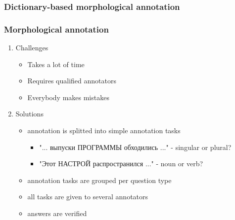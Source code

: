 \documentclass{beamer}
\begin{document}
\begin{frame}
\frametitle{Dictionary-based morphological annotation}
\begin{figure}
\end{figure}
\end{frame}


\begin{frame}
\frametitle{Morphological annotation}
\begin{enumerate}
\item{Challenges}
    \begin{itemize}
    \item{Takes a lot of time}
    \item{Requires qualified annotators}
    \item{Everybody makes mistakes}
    \end{itemize}
    \pause
\item{Solutions}
    \begin{itemize}
    \item{annotation is splitted into simple annotation tasks}
        \begin{itemize}
        \item{"... выпуски ПРОГРАММЫ обходились ..." - singular or plural?}
        \item{"Этот НАСТРОЙ распространился ..." - noun or verb?}
        \end{itemize}
    \item{annotation tasks are grouped per question type}
    \item{all tasks are given to several annotators}
    \item{answers are verified}
    \end{itemize}
\end{enumerate}
\end{frame}
\end{document}
